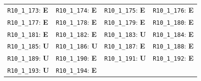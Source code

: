 \begin{longtable}{llll}
\texttt{R10\_1\_173}: \textbf{E} & \texttt{R10\_1\_174}: \textbf{E} & \texttt{R10\_1\_175}: \textbf{E} & \texttt{R10\_1\_176}: \textbf{E} \\
\texttt{R10\_1\_177}: \textbf{E} & \texttt{R10\_1\_178}: \textbf{E} & \texttt{R10\_1\_179}: \textbf{E} & \texttt{R10\_1\_180}: \textbf{E} \\
\texttt{R10\_1\_181}: \textbf{E} & \texttt{R10\_1\_182}: \textbf{E} & \texttt{R10\_1\_183}: \textbf{U} & \texttt{R10\_1\_184}: \textbf{E} \\
\texttt{R10\_1\_185}: \textbf{U} & \texttt{R10\_1\_186}: \textbf{U} & \texttt{R10\_1\_187}: \textbf{E} & \texttt{R10\_1\_188}: \textbf{E} \\
\texttt{R10\_1\_189}: \textbf{U} & \texttt{R10\_1\_190}: \textbf{E} & \texttt{R10\_1\_191}: \textbf{U} & \texttt{R10\_1\_192}: \textbf{E} \\
\texttt{R10\_1\_193}: \textbf{U} & \texttt{R10\_1\_194}: \textbf{E} &  &  \\
\bottomrule
\end{longtable}
